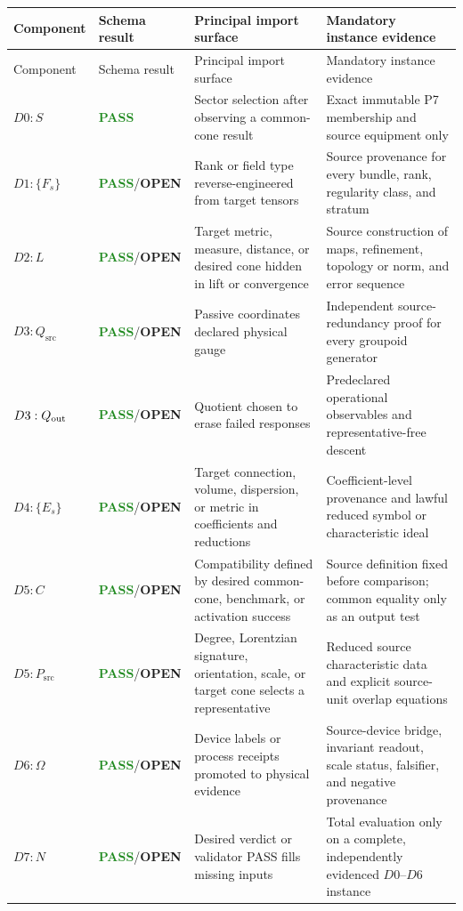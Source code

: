 \documentclass[11pt]{article}
\newcommand{\pass}{\textcolor{ForestGreen}{\textbf{PASS}}}
\newcommand{\open}{\textcolor{BurntOrange}{\textbf{OPEN}}}
\newcommand{\src}{\mathrm{src}}
\begin{document}
\begin{longtable}{@{}p{}p{}p{}p{}@{}}
\toprule
Component & Schema result & Principal import surface & Mandatory instance evidence \\
\midrule
\endfirsthead
\toprule
Component & Schema result & Principal import surface & Mandatory instance evidence \\
\midrule
\endhead
$D0:S$ & \pass & Sector selection after observing a common-cone result & Exact immutable P7 membership and source equipment only \\
$D1:\{F_s\}$ & \pass/\open & Rank or field type reverse-engineered from target tensors & Source provenance for every bundle, rank, regularity class, and stratum \\
$D2:L$ & \pass/\open & Target metric, measure, distance, or desired cone hidden in lift or convergence & Source construction of maps, refinement, topology or norm, and error sequence \\
$D3:Q_{\src}$ & \pass/\open & Passive coordinates declared physical gauge & Independent source-redundancy proof for every groupoid generator \\
$D3:Q_{\rm out}$ & \pass/\open & Quotient chosen to erase failed responses & Predeclared operational observables and representative-free descent \\
$D4:\{E_s\}$ & \pass/\open & Target connection, volume, dispersion, or metric in coefficients and reductions & Coefficient-level provenance and lawful reduced symbol or characteristic ideal \\
$D5:C$ & \pass/\open & Compatibility defined by desired common-cone, benchmark, or activation success & Source definition fixed before comparison; common equality only as an output test \\
$D5:P_{\src}$ & \pass/\open & Degree, Lorentzian signature, orientation, scale, or target cone selects a representative & Reduced source characteristic data and explicit source-unit overlap equations \\
$D6:\Omega$ & \pass/\open & Device labels or process receipts promoted to physical evidence & Source-device bridge, invariant readout, scale status, falsifier, and negative provenance \\
$D7:N$ & \pass/\open & Desired verdict or validator PASS fills missing inputs & Total evaluation only on a complete, independently evidenced $D0$--$D6$ instance \\
\bottomrule
\end{longtable}
\end{document}
